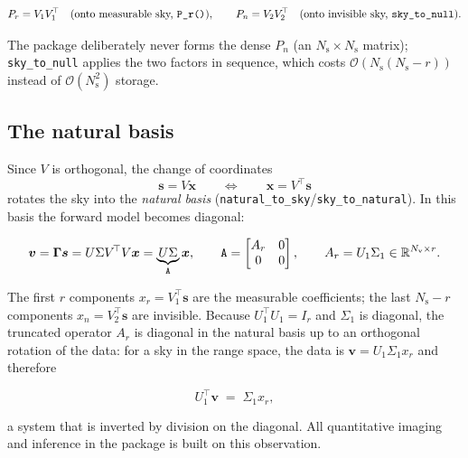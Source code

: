 \documentclass[11pt,a4paper]{article}
\newcommand{\R}{\mathbb{R}}
\newcommand{\Ns}{N_{\mathrm{s}}}
\newcommand{\Nv}{N_{\mathrm{v}}}
\newcommand{\Gammam}{\boldsymbol{\Gamma}}
\newcommand{\svec}{\boldsymbol{s}}
\newcommand{\vvec}{\boldsymbol{v}}
\begin{document}
\begin{equation}
  P_r = V_1V_1^{\!\top}
  \quad(\text{onto measurable sky, \texttt{P\_r()}}),\qquad
  P_n = V_2V_2^{\!\top}
  \quad(\text{onto invisible sky, \texttt{sky\_to\_null}}).
\end{equation}

The package deliberately never forms the dense $P_n$ (an
$\Ns\times\Ns$ matrix); \texttt{sky\_to\_null} applies the two factors in
sequence, which costs $\mathcal{O}(\Ns(\Ns-r))$ instead of
$\mathcal{O}(\Ns^2)$ storage.

\subsection{The natural basis}

Since $V$ is orthogonal, the change of coordinates
\begin{equation}
  \label{eq:natural}
  \svec = V\boldsymbol{x}
  \qquad\Longleftrightarrow\qquad
  \boldsymbol{x}=V^{\!\top}\svec
\end{equation}
rotates the sky into the \emph{natural basis}
(\texttt{natural\_to\_sky}/\texttt{sky\_to\_natural}). In this basis the
forward model becomes diagonal:

\begin{equation}
  \vvec = \Gammam\svec = U\Sigma V^{\!\top} V\boldsymbol{x}
       = \underbrace{U\Sigma}_{\text{\texttt{A}}}\boldsymbol{x},
  \qquad
  \text{\texttt{A}} =
  \begin{bmatrix} A_r & 0\\ 0 & 0\end{bmatrix},
  \qquad A_r = U_1\Sigma_1 \in \R^{\Nv\times r}.
\end{equation}

The first $r$ components $x_r=V_1^{\!\top}\svec$ are the measurable
coefficients; the last $\Ns-r$ components $x_n=V_2^{\!\top}\svec$ are
invisible. Because $U_1^{\!\top}U_1=I_r$ and $\Sigma_1$ is diagonal, the
truncated operator $A_r$ is diagonal in the natural basis up to an orthogonal
rotation of the data: for a sky in the range space, the data is
$\vvec = U_1\Sigma_1 x_r$ and therefore

\begin{equation}
  \label{eq:diag}
  U_1^{\!\top}\vvec \;=\; \Sigma_1 x_r,
\end{equation}

a system that is inverted by division on the diagonal. All quantitative imaging
and inference in the package is built on this observation.
\end{document}
